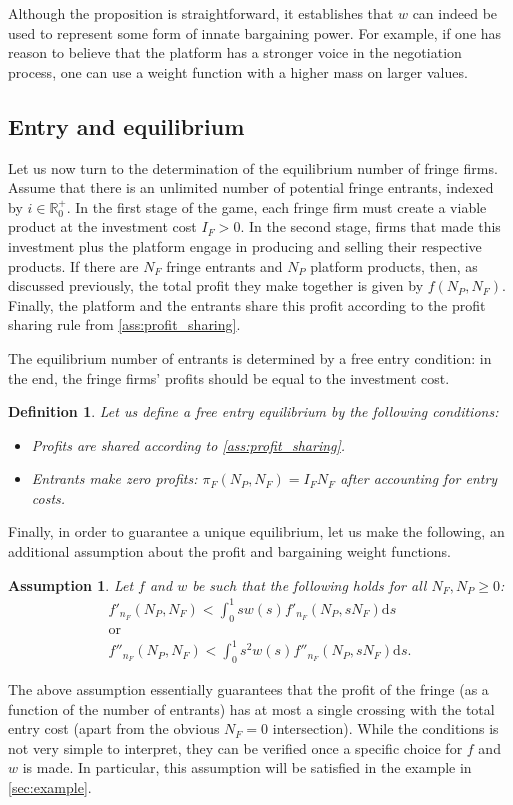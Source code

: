\documentclass[a4paper]{article}
\newtheorem{definition}{Definition}
\newtheorem{assumption}{Assumption}
\newcommand{\ds}{\mathrm{d}s}
\begin{document}
Although the proposition is straightforward, it establishes that $w$ can indeed be used to represent some form of innate bargaining power.
For example, if one has reason to believe that the platform has a stronger voice in the negotiation process, one can use a weight function with a higher mass on larger values.


\subsection{Entry and equilibrium}

Let us now turn to the determination of the equilibrium number of fringe firms.
Assume that there is an unlimited number of potential fringe entrants, indexed by $i \in \mathbb{R}^+_0$.
In the first stage of the game, each fringe firm must create a viable product at the investment cost $I_F > 0$.
In the second stage, firms that made this investment plus the platform engage in producing and selling their respective products.
If there are $N_F$ fringe entrants and $N_P$ platform products, then, as discussed previously, the total profit they make together is given by $f(N_P, N_F)$.
Finally, the platform and the entrants share this profit according to the profit sharing rule from \cref{ass:profit_sharing}.

The equilibrium number of entrants is determined by a free entry condition: in the end, the fringe firms' profits should be equal to the investment cost.
\begin{definition}
    \label{ass:free_entry}
    Let us define a free entry equilibrium by the following conditions:
    \begin{itemize}
        \item Profits are shared according to \cref{ass:profit_sharing}.
        \item Entrants make zero profits: $\pi_F(N_P, N_F) = I_F N_F$ after accounting for entry costs.
    \end{itemize}
\end{definition}

Finally, in order to guarantee a unique equilibrium, let us make the following, an additional assumption about the profit and bargaining weight functions.
\begin{assumption}
    \label{ass:single_crossing}
    Let $f$ and $w$ be such that the following holds for all $N_F, N_P \geq 0$:
    \begin{gather*}
        f'_{n_F} (N_P, N_F) < \int_0^1 s w(s) f'_{n_F} (N_P, s N_F) \ds \\
        \text{or} \\
        f''_{n_F} (N_P, N_F) < \int_0^1 s^2 w(s) f''_{n_F} (N_P, s N_F) \ds.
    \end{gather*}
\end{assumption}
The above assumption essentially guarantees that the profit of the fringe (as a function of the number of entrants) has at most a single crossing with the total entry cost (apart from the obvious $N_F=0$ intersection).
While the conditions is not very simple to interpret, they can be verified once a specific choice for $f$ and $w$ is made.
In particular, this assumption will be satisfied in the example in \cref{sec:example}.
\end{document}
